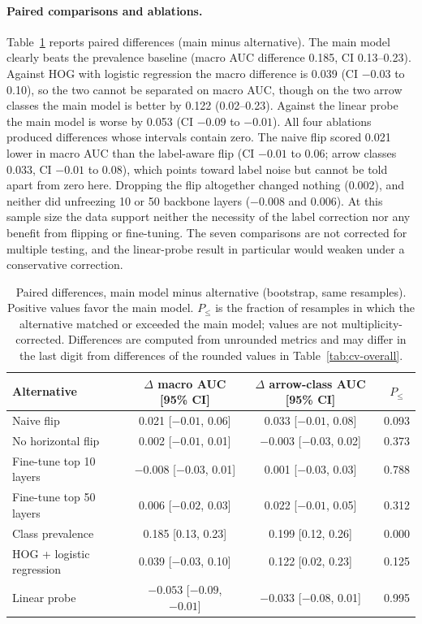\documentclass[11pt]{article}
\begin{document}
\paragraph{Paired comparisons and ablations.} Table~\ref{tab:cv-paired} reports paired differences (main minus alternative). The main model clearly beats the prevalence baseline (macro AUC difference 0.185, CI 0.13--0.23). Against HOG with logistic regression the macro difference is 0.039 (CI $-0.03$ to 0.10), so the two cannot be separated on macro AUC, though on the two arrow classes the main model is better by 0.122 (0.02--0.23). Against the linear probe the main model is worse by 0.053 (CI $-0.09$ to $-0.01$). All four ablations produced differences whose intervals contain zero. The naive flip scored 0.021 lower in macro AUC than the label-aware flip (CI $-0.01$ to 0.06; arrow classes 0.033, CI $-0.01$ to 0.08), which points toward label noise but cannot be told apart from zero here. Dropping the flip altogether changed nothing (0.002), and neither did unfreezing 10 or 50 backbone layers ($-0.008$ and 0.006). At this sample size the data support neither the necessity of the label correction nor any benefit from flipping or fine-tuning. The seven comparisons are not corrected for multiple testing, and the linear-probe result in particular would weaken under a conservative correction.

\begin{table}[htbp]
\centering\small
\caption{Paired differences, main model minus alternative (bootstrap, same resamples). Positive values favor the main model. $P_{\le}$ is the fraction of resamples in which the alternative matched or exceeded the main model; values are not multiplicity-corrected. Differences are computed from unrounded metrics and may differ in the last digit from differences of the rounded values in Table~\ref{tab:cv-overall}.}
\label{tab:cv-paired}
\begin{tabular}{lccc}
\toprule
Alternative & $\Delta$ macro AUC [95\% CI] & $\Delta$ arrow-class AUC [95\% CI] & $P_{\le}$ \\
\midrule
Naive flip & 0.021 [$-0.01$, 0.06] & 0.033 [$-0.01$, 0.08] & 0.093 \\
No horizontal flip & 0.002 [$-0.01$, 0.01] & $-0.003$ [$-0.03$, 0.02] & 0.373 \\
Fine-tune top 10 layers & $-0.008$ [$-0.03$, 0.01] & 0.001 [$-0.03$, 0.03] & 0.788 \\
Fine-tune top 50 layers & 0.006 [$-0.02$, 0.03] & 0.022 [$-0.01$, 0.05] & 0.312 \\
\midrule
Class prevalence & 0.185 [0.13, 0.23] & 0.199 [0.12, 0.26] & 0.000 \\
HOG + logistic regression & 0.039 [$-0.03$, 0.10] & 0.122 [0.02, 0.23] & 0.125 \\
Linear probe & $-0.053$ [$-0.09$, $-0.01$] & $-0.033$ [$-0.08$, 0.01] & 0.995 \\
\bottomrule
\end{tabular}
\end{table}
\end{document}
